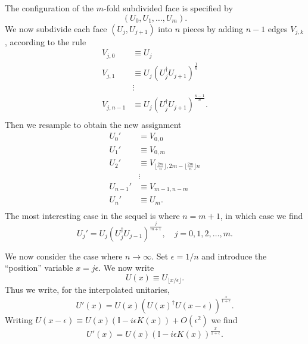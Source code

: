 \documentclass[12pt]{amsart}
\theoremstyle{definition}
\theoremstyle{remark}
\numberwithin{equation}{section}
\begin{document}
The configuration of the $m$-fold subdivided face is specified by
\begin{equation}
	(U_0, U_1, \ldots, U_{m}).
\end{equation}
We now subdivide each face $(U_{j},U_{j+1})$ into $n$ pieces by adding $n-1$ edges $V_{j,k}$,   according to the rule
\begin{equation}
	\begin{split}
		V_{j,0} &\equiv U_j \\
		V_{j,1} &\equiv U_j (U_j^\dag U_{j+1})^{\frac{1}{n}} \\
			&\vdots \\
		V_{j,n-1} &\equiv U_j (U_j^\dag U_{j+1})^{\frac{n-1}{n}}. \\
	\end{split}
\end{equation}
Then we resample to obtain the new assignment
\begin{equation}
	\begin{split}
		U_0' &= V_{0,0} \\
		U_1' &\equiv V_{0,m}\\
		U_2' &\equiv V_{\lfloor\frac{2m}{n}\rfloor,2m - \lfloor\frac{2m}{n}\rfloor n}\\
			&\vdots \\
		U_{n-1}'&\equiv V_{m-1,n-m}\\
		U_{n}' &\equiv U_m. \\
	\end{split}
\end{equation}
The most interesting case in the sequel is where $n= m+1$, in which case we find
\begin{equation}
	U_j' = U_{j}(U_{j}^\dag U_{j-1})^{\frac{j}{m+1}}, \quad j = 0,1, 2, \ldots, m.
\end{equation}

We now consider the case where $n\rightarrow \infty$. Set $\epsilon = 1/n$ and introduce the ``position'' variable $x = j\epsilon$. We now write 
\begin{equation}
	U(x) \equiv U_{\lfloor x/\epsilon \rfloor}.
\end{equation}
Thus we write, for the interpolated unitaries,
\begin{equation}
	U'(x) = U(x)(U(x)^\dag U(x-\epsilon))^{\frac{x}{1+\epsilon}}.
\end{equation}
Writing $U(x-\epsilon) \equiv U(x)(\mathbb{I}-i\epsilon K(x)) + O(\epsilon^2)$ we find
\begin{equation}
	U'(x) = U(x)(\mathbb{I}-i\epsilon K(x))^{\frac{x}{1+\epsilon}}.
\end{equation}
\end{document}
